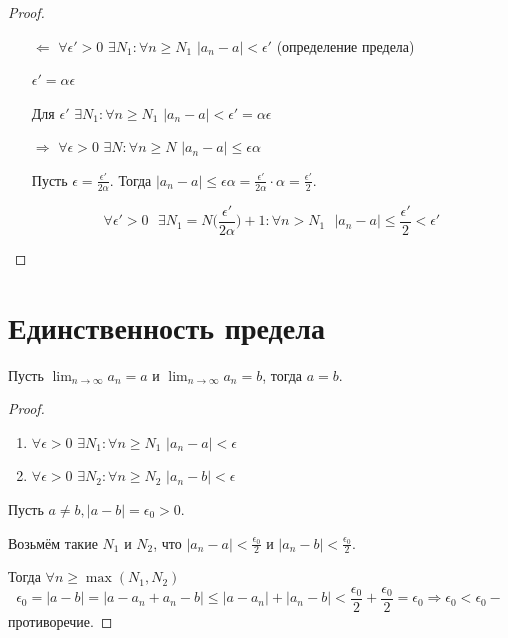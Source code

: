 	\begin{proof}
		\begin{itemize}
			\item[$\Leftarrow$] $\forall \epsilon' > 0$ $\exists N_1 : \forall n \geqslant N_1$ $|a_n - a| < \epsilon'$ (определение предела)
			
			$\epsilon' = \alpha \epsilon$
			
			Для $\epsilon'$ $\exists N_1: \forall n \geqslant N_1$ $|a_n - a| < \epsilon' = \alpha \epsilon$
			\item[$\Rightarrow$] $\forall \epsilon > 0$ $\exists N: \forall n \geqslant N$ $|a_n - a| \leqslant \epsilon \alpha$
			
			Пусть $\epsilon = \frac{\epsilon'}{2 \alpha}$. Тогда $|a_n - a| \leqslant \epsilon \alpha = \frac{\epsilon'}{2 \alpha} \cdot \alpha = \frac{\epsilon'}{2}$.
			
			\[ \forall \epsilon' > 0 \text{ } \exists N_1 = N\bigg(\frac{\epsilon'}{2 \alpha}\bigg) + 1: \forall n > N_1 \text{ } |a_n - a| \leqslant \frac{\epsilon'}{2} < \epsilon' \]
		\end{itemize}
	\end{proof}
	
	\section{Единственность предела}
	
	\begin{sentence}
		Пусть $\lim_{n \to \infty} a_n = a$ и $\lim_{n \to \infty} a_n = b$, тогда $a = b$.
	\end{sentence}
	
	\begin{proof}
		\begin{enumerate}
			\item $\forall \epsilon > 0$ $\exists N_1: \forall n \geqslant N_1$ $|a_n - a| < \epsilon$
			\item $\forall \epsilon > 0$ $\exists N_2: \forall n \geqslant N_2$ $|a_n - b| < \epsilon$
		\end{enumerate}
		Пусть $a \neq b, |a - b| = \epsilon_0 > 0$.
		
		Возьмём такие $N_1$ и $N_2$, что $|a_n - a| < \frac{\epsilon_0}{2}$ и $|a_n - b| < \frac{\epsilon_0}{2}$.
		
		Тогда $\forall n \geqslant \max{(N_1, N_2)}$
		\[ \epsilon_0 = |a - b| = |a - a_n + a_n - b| \leqslant |a - a_n| + |a_n - b| < \frac{\epsilon_0}{2} + \frac{\epsilon_0}{2} = \epsilon_0 \Rightarrow \epsilon_0 < \epsilon_0 - \]
		противоречие.
	\end{proof}
	
